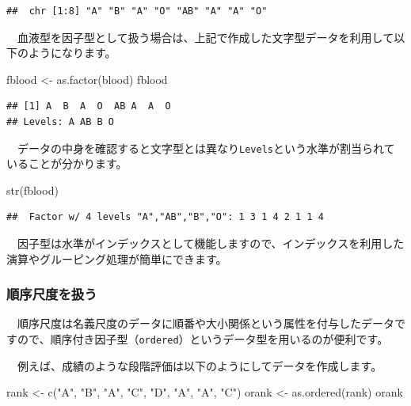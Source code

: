 \documentclass[
  12pt,
]{book}
\newenvironment{Shaded}{\begin{snugshade}}{\end{snugshade}}
\newcommand{\FunctionTok}[1]{\textcolor[rgb]{0.00,0.00,0.00}{#1}}
\newcommand{\NormalTok}[1]{#1}
\newcommand{\OtherTok}[1]{\textcolor[rgb]{0.56,0.35,0.01}{#1}}
\newcommand{\StringTok}[1]{\textcolor[rgb]{0.31,0.60,0.02}{#1}}
\begin{document}
\begin{verbatim}
##  chr [1:8] "A" "B" "A" "O" "AB" "A" "A" "O"
\end{verbatim}

　血液型を因子型として扱う場合は、上記で作成した文字型データを利用して以下のようになります。

\begin{Shaded}
\begin{Highlighting}[numbers=left,,]
\NormalTok{fblood }\OtherTok{\textless{}{-}} \FunctionTok{as.factor}\NormalTok{(blood)}
\NormalTok{fblood}
\end{Highlighting}
\end{Shaded}

\begin{verbatim}
## [1] A  B  A  O  AB A  A  O 
## Levels: A AB B O
\end{verbatim}

　データの中身を確認すると文字型とは異なり\texttt{Levels}という水準が割当られていることが分かります。

\begin{Shaded}
\begin{Highlighting}[numbers=left,,]
\FunctionTok{str}\NormalTok{(fblood)}
\end{Highlighting}
\end{Shaded}

\begin{verbatim}
##  Factor w/ 4 levels "A","AB","B","O": 1 3 1 4 2 1 1 4
\end{verbatim}

　因子型は水準がインデックスとして機能しますので、インデックスを利用した演算やグルーピング処理が簡単にできます。

\hypertarget{ux9806ux5e8fux5c3aux5ea6ux3092ux6271ux3046}{%
\subsubsection*{順序尺度を扱う}\label{ux9806ux5e8fux5c3aux5ea6ux3092ux6271ux3046}}

　順序尺度は名義尺度のデータに順番や大小関係という属性を付与したデータですので、順序付き因子型（\texttt{ordered}）というデータ型を用いるのが便利です。

　例えば、成績のような段階評価は以下のようにしてデータを作成します。

\begin{Shaded}
\begin{Highlighting}[numbers=left,,]
\NormalTok{rank }\OtherTok{\textless{}{-}} \FunctionTok{c}\NormalTok{(}\StringTok{"A"}\NormalTok{, }\StringTok{"B"}\NormalTok{, }\StringTok{"A"}\NormalTok{, }\StringTok{"C"}\NormalTok{, }\StringTok{"D"}\NormalTok{, }\StringTok{"A"}\NormalTok{, }\StringTok{"A"}\NormalTok{, }\StringTok{"C"}\NormalTok{)}
\NormalTok{orank }\OtherTok{\textless{}{-}} \FunctionTok{as.ordered}\NormalTok{(rank)}
\NormalTok{orank}
\end{Highlighting}
\end{Shaded}
\end{document}
